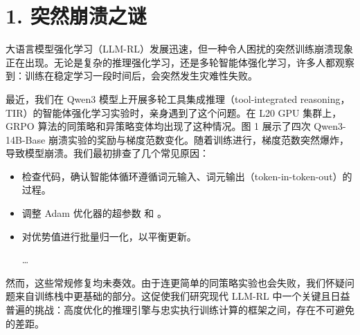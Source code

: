 


\hypertarget{src-271211a5-58b7-804d-b209-d12262749c7e}{}
\section*{1. 突然崩溃之谜}
{}



大语言模型强化学习（LLM-RL）发展迅速，但一种令人困扰的突然训练崩溃现象正在出现。无论是复杂的推理强化学习，还是多轮智能体强化学习，许多人都观察到：训练在稳定学习一段时间后，会突然发生灾难性失败。



最近，我们在 Qwen3 模型上开展多轮工具集成推理（tool-integrated reasoning，TIR）的智能体强化学习实验时，亲身遇到了这个问题。在 L20 GPU 集群上，GRPO 算法的同策略和异策略变体均出现了这种情况。图 1 展示了四次 Qwen3-14B-Base 崩溃实验的奖励与梯度范数变化。随着训练进行，梯度范数突然爆炸，导致模型崩溃。我们最初排查了几个常见原因：



\begin{itemize}

\item 检查代码，确认智能体循环遵循词元输入、词元输出（token-in-token-out）的过程。


\item 调整 Adam 优化器的超参数  和 。


\item 对优势值进行批量归一化，以平衡更新。


\ldots


\end{itemize}


然而，这些常规修复均未奏效。由于连更简单的同策略实验也会失败，我们怀疑问题来自训练栈中更基础的部分。这促使我们研究现代 LLM-RL 中一个关键且日益普遍的挑战：高度优化的推理引擎与忠实执行训练计算的框架之间，存在不可避免的差距。


